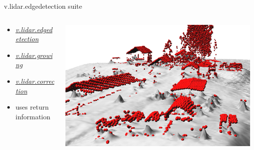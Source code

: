 \documentclass[xcolor={dvipsnames,usenames},beamer,aspectratio=169]{beamer}
\newcommand{\gmodule}[1]{\href{http://grass.osgeo.org/grass71/manuals/#1.html}{\emph{#1}}}
\begin{document}
\begin{frame}{v.lidar.edgedetection suite}

\begin{columns}
\begin{column}{0.28\textwidth}

\begin{itemize}
  \item \gmodule{v.lidar.edgedetection}
  \item \gmodule{v.lidar.growing}
  \item \gmodule{v.lidar.correction}
  \item uses return information
\end{itemize}

\end{column}
\begin{column}{0.7\textwidth}

\begin{center}
  \includegraphics[width=\textwidth]{grass/v_lidar_edgedetection_objects}
\end{center}

\end{column}
\end{columns}

\end{frame}
\end{document}
